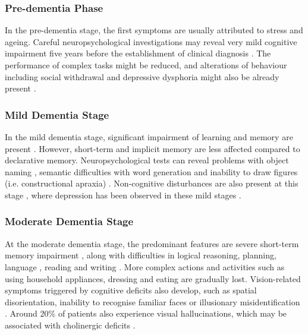 \subsubsection{Pre-dementia Phase}

In the pre-dementia stage, the first symptoms are usually attributed to stress and ageing. Careful neuropsychological investigations may reveal very mild cognitive impairment five years before the establishment of clinical diagnosis \cite{forstl1999clinical}. The performance of complex tasks might be reduced, and alterations of behaviour including social withdrawal and depressive dysphoria might also be already present \cite{forstl1999clinical}. 

\subsubsection{Mild Dementia Stage}

In the mild dementia stage, significant impairment of learning and memory are present \cite{forstl1999clinical}. However, short-term and implicit memory are less affected compared to declarative memory. Neuropsychological tests can reveal problems with object naming \cite{chobor1990semantic,locascio1995cognitive}, semantic difficulties with word generation \cite{chobor1990semantic,locascio1995cognitive} and inability to draw figures (i.e. constructional apraxia) \cite{moore1984drawing}. Non-cognitive disturbances are also present at this stage \cite{haupt1992psychopathologische}, where depression has been observed in these mild stages \cite{burns1990psychiatric}.

\subsubsection{Moderate Dementia Stage}

At the moderate dementia stage, the predominant features are severe short-term memory impairment \cite{beatty1988retrograde}, along with difficulties in logical reasoning, planning, language \cite{romero1995pragmatische}, reading \cite{cummings1986pattern} and writing \cite{neils1989descriptive}. More complex actions and activities such as using household appliances, dressing and eating are gradually lost. Vision-related symptoms triggered by cognitive deficits also develop, such as spatial disorientation, inability to recognise familiar faces or illusionary misidentification \cite{reisberg1996behavioral}. Around 20\% of patients also experience visual hallucinations, which may be associated with cholinergic deficits \cite{perry1990visual}.

